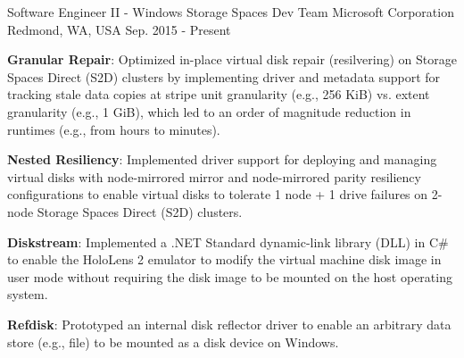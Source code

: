 

\begin{cventries}

  \cventry
    {Software Engineer II - Windows Storage Spaces Dev Team} %
    {Microsoft Corporation} %
    {Redmond, WA, USA} %
    {Sep. 2015 - Present} %
    {
      \begin{cvitems} %
        \item {
          \textbf{Granular Repair}: Optimized in-place virtual disk repair (resilvering) on Storage
          Spaces Direct (S2D) clusters by implementing driver and metadata support for tracking
          stale data copies at stripe unit granularity (e.g., 256 KiB) vs. extent granularity
          (e.g., 1 GiB), which led to an order of magnitude reduction in runtimes (e.g., from hours
          to minutes).
        }
        \item {
          \textbf{Nested Resiliency}: Implemented driver support for deploying and managing virtual
          disks with node-mirrored mirror and node-mirrored parity resiliency configurations to
          enable virtual disks to tolerate 1 node + 1 drive failures on 2-node Storage Spaces
          Direct (S2D) clusters.
        }
        \item {
          \textbf{Diskstream}: Implemented a .NET Standard dynamic-link library (DLL) in C\# to
          enable the HoloLens 2 emulator to modify the virtual machine disk image in user mode
          without requiring the disk image to be mounted on the host operating system.
        }
        \item {
          \textbf{Refdisk}: Prototyped an internal disk reflector driver to enable an arbitrary
          data store (e.g., file) to be mounted as a disk device on Windows.
        }
      \end{cvitems}
    }


\end{cventries}
